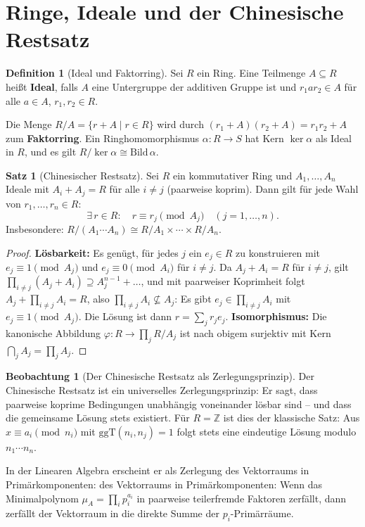 ﻿\documentclass[a4paper,12pt]{report}
\theoremstyle{definition}
\newtheorem{definition}{Definition}
\newtheorem{satz}{Satz}
\newtheorem{beobachtung}{Beobachtung}
\begin{document}
\section{Ringe, Ideale und der Chinesische Restsatz}

\begin{definition}[Ideal und Faktorring]
    Sei $R$ ein Ring. Eine Teilmenge $A \subseteq R$ heißt \textbf{Ideal},
    falls $A$ eine Untergruppe der additiven Gruppe ist und
    $r_1 a r_2 \in A$ für alle $a \in A$, $r_1, r_2 \in R$.

    Die Menge $R/A = \{r + A \mid r \in R\}$ wird durch
    $(r_1 + A)(r_2 + A) = r_1 r_2 + A$ zum \textbf{Faktorring}.
    Ein Ringhomomorphismus $\alpha : R \to S$ hat Kern $\ker \alpha$
    als Ideal in $R$, und es gilt $R/\ker\alpha \cong \mathrm{Bild}\,\alpha$.
\end{definition}

\begin{satz}[Chinesischer Restsatz]
    Sei $R$ ein kommutativer Ring und $A_1, \dots, A_n$ Ideale mit
    $A_i + A_j = R$ für alle $i \neq j$ (paarweise koprim).
    Dann gilt für jede Wahl von $r_1, \dots, r_n \in R$:
    \[
        \exists\, r \in R : \quad r \equiv r_j \pmod{A_j}
        \quad (j = 1, \dots, n).
    \]
    Insbesondere: $R / (A_1 \cdots A_n) \cong R/A_1 \times \cdots \times R/A_n$.
\end{satz}
\begin{proof}
    \textbf{Lösbarkeit:} Es genügt, für jedes $j$ ein $e_j \in R$ zu konstruieren
    mit $e_j \equiv 1 \pmod{A_j}$ und $e_j \equiv 0 \pmod{A_i}$ für $i \neq j$.
    Da $A_j + A_i = R$ für $i \neq j$, gilt $\prod_{i \neq j} (A_j + A_i) \supseteq A_j^{n-1} + \ldots$,
    und mit paarweiser Koprimheit folgt $A_j + \prod_{i \neq j} A_i = R$,
    also $\prod_{i \neq j} A_i \not\subseteq A_j$: Es gibt $e_j \in \prod_{i \neq j} A_i$
    mit $e_j \equiv 1 \pmod{A_j}$. Die Lösung ist dann $r = \sum_j r_j e_j$.
    \textbf{Isomorphismus:} Die kanonische Abbildung $\varphi : R \to \prod_j R/A_j$
    ist nach obigem surjektiv mit Kern $\bigcap_j A_j = \prod_j A_j$.
\end{proof}


\begin{beobachtung}[Der Chinesische Restsatz als Zerlegungsprinzip]
    Der Chinesische Restsatz ist ein universelles Zerlegungsprinzip:
    Er sagt, dass paarweise koprime Bedingungen unabhängig voneinander
    lösbar sind -- und dass die gemeinsame Lösung stets existiert.
    Für $R = \mathbb{Z}$ ist dies der klassische Satz: Aus
    $x \equiv a_i \pmod{n_i}$ mit $\mathrm{ggT}(n_i, n_j) = 1$ folgt
    stets eine eindeutige Lösung modulo $n_1 \cdots n_n$.

    In der Linearen Algebra erscheint er als Zerlegung
    des Vektorraums in Primär\-kom\-po\-nen\-ten:
    des Vektorraums in Primär\-komponenten: Wenn das Minimalpolynom
    $\mu_A = \prod_i p_i^{a_i}$ in paarweise teilerfremde Faktoren
    zerfällt, dann zerfällt der Vektorraum
    in die direkte Summe der $p_i$-Primär\-räume.
\end{beobachtung}
\end{document}

